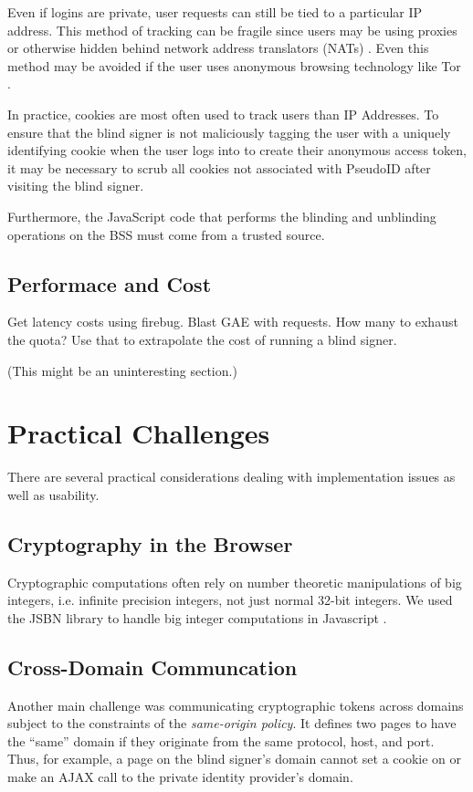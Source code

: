 \documentclass{llncs}
\begin{document}
Even if logins are private, user requests can still be tied to a particular IP address. This method of tracking can be fragile since users may be using proxies or otherwise hidden behind network address translators (NATs) \cite{Pool00}. Even this method may be avoided if the user uses anonymous browsing technology like Tor \cite{Tor}.

In practice, cookies are most often used to track users than IP Addresses. To ensure that the blind signer is not maliciously tagging the user with a uniquely identifying cookie when the user logs into to create their anonymous access token, it may be necessary to scrub all cookies not associated with PseudoID after visiting the blind signer.

Furthermore, the JavaScript code that performs the blinding and unblinding
operations on the BSS must come from a trusted source.

\subsection{Performace and Cost}

Get latency costs using firebug. Blast GAE with requests. How many to
exhaust the quota? Use that to extrapolate the cost of running a blind
signer.

(This might be an uninteresting section.)

\section{Practical Challenges}

There are several practical considerations dealing with implementation issues as
well as usability.

\subsection{Cryptography in the Browser}

Cryptographic computations often rely on number theoretic manipulations of big
integers, i.e. infinite precision integers, not just normal 32-bit integers. We
used the JSBN library to handle big integer computations in Javascript
\cite{Jsbn}.

\subsection{Cross-Domain Communcation}

Another main challenge was communicating cryptographic tokens across domains
subject to the constraints of the \emph{same-origin policy}. It defines two
pages to have the ``same'' domain if they originate from the same protocol,
host, and port. Thus, for example, a page on the blind signer's domain cannot
set a cookie on or make an AJAX call to the private identity provider's domain.
\end{document}
